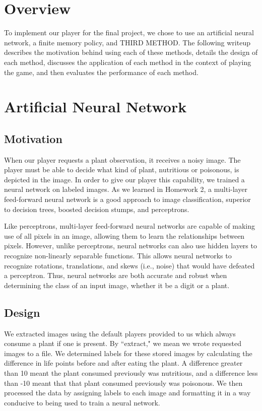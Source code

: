 \documentclass[solution, letterpaper]{cs121}
\begin{document}


\section*{Overview}
To implement our player for the final project, we chose to use an artificial neural network, a finite memory policy, and THIRD METHOD. The following writeup describes the motivation behind using each of these methods, details the design of each method, discusses the application of each method in the context of playing the game, and then evaluates the performance of each method. 

\section{Artificial Neural Network}
\subsection{Motivation}
When our player requests a plant observation, it receives a noisy image. The player must be able to decide what kind of plant, nutritious or poisonous, is depicted in the image. In order to give our player this capability, we trained a neural network on labeled images. As we learned in Homework 2, a multi-layer feed-forward neural network is a good approach to image classification, superior to decision trees, boosted decision stumps, and perceptrons. 

Like perceptrons, multi-layer feed-forward neural networks are capable of making use of all pixels in an image, allowing them to learn the relationships between pixels. However, unlike perceptrons, neural networks can also use hidden layers to recognize non-linearly separable functions. This allows neural networks to recognize rotations, translations, and skews (i.e., noise) that would have defeated a perceptron. Thus, neural networks are both accurate and robust when determining the class of an input image, whether it be a digit or a plant.

\subsection{Design}
We extracted images using the default players provided to us which always consume a plant if one is present. By ``extract," we mean we wrote requested images to a file. We determined labels for these stored images by calculating the difference in life points before and after eating the plant. A difference greater than 10 meant the plant consumed previously was nutritious, and a difference less than -10 meant that that plant consumed previously was poisonous. We then processed the data by assigning labels to each image and formatting it in a way conducive to being used to train a neural network.
\end{document}
